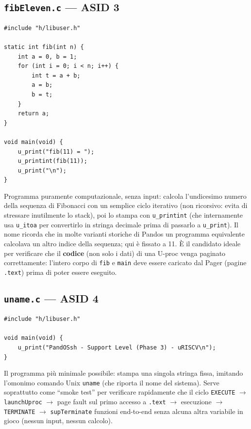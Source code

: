 \documentclass[11pt,a4paper]{article}
\newcommand{\code}[1]{\texttt{#1}}
\begin{document}
\subsection{\code{fibEleven.c} --- ASID 3}
\begin{lstlisting}
#include "h/libuser.h"

static int fib(int n) {
    int a = 0, b = 1;
    for (int i = 0; i < n; i++) {
        int t = a + b;
        a = b;
        b = t;
    }
    return a;
}

void main(void) {
    u_print("fib(11) = ");
    u_printint(fib(11));
    u_print("\n");
}
\end{lstlisting}
Programma puramente computazionale, senza input: calcola l'undicesimo
numero della sequenza di Fibonacci con un semplice ciclo iterativo (non
ricorsivo: evita di stressare inutilmente lo stack), poi lo stampa con
\code{u\_printint} (che internamente usa \code{u\_itoa} per convertirlo in
stringa decimale prima di passarlo a \code{u\_print}). Il nome ricorda che
in molte varianti storiche di Pandos un programma equivalente calcolava un
altro indice della sequenza; qui è fissato a 11. È il candidato ideale per
verificare che il \textbf{codice} (non solo i dati) di una U-proc venga
paginato correttamente: l'intero corpo di \code{fib} e \code{main} deve
essere caricato dal Pager (pagine \code{.text}) prima di poter essere
eseguito.

\subsection{\code{uname.c} --- ASID 4}
\begin{lstlisting}
#include "h/libuser.h"

void main(void) {
    u_print("PandOSsh - Support Level (Phase 3) - uRISCV\n");
}
\end{lstlisting}
Il programma più minimale possibile: stampa una singola stringa fissa,
imitando l'omonimo comando Unix \code{uname} (che riporta il nome del
sistema). Serve soprattutto come ``smoke test'' per verificare rapidamente
che il ciclo \code{EXECUTE} $\to$ \code{launchUproc} $\to$ page fault sul
primo accesso a \code{.text} $\to$ esecuzione $\to$ \code{TERMINATE} $\to$
\code{supTerminate} funzioni end-to-end senza alcuna altra variabile in
gioco (nessun input, nessun calcolo).
\end{document}
